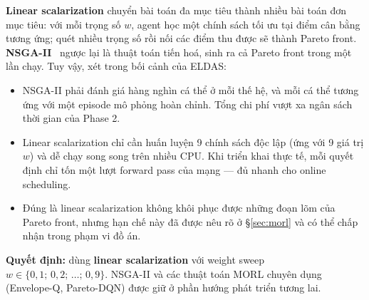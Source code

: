 \textbf{Linear scalarization} chuyển bài toán đa mục tiêu thành nhiều
bài toán đơn mục tiêu: với mỗi trọng số $w$, agent học một chính sách
tối ưu tại điểm cân bằng tương ứng; quét nhiều trọng số rồi nối các
điểm thu được sẽ thành Pareto front. \textbf{NSGA-II}~\cite{deb2002fast}
ngược lại là thuật toán tiến hoá, sinh ra cả Pareto front trong một
lần chạy. Tuy vậy, xét trong bối cảnh của ELDAS:
\begin{itemize}
  \item NSGA-II phải đánh giá hàng nghìn cá thể ở mỗi thế hệ, và
        mỗi cá thể tương ứng với một episode mô phỏng hoàn chỉnh.
        Tổng chi phí vượt xa ngân sách thời gian của Phase 2.
  \item Linear scalarization chỉ cần huấn luyện 9 chính sách độc
        lập (ứng với 9 giá trị $w$) và dễ chạy song song trên
        nhiều CPU. Khi triển khai thực tế, mỗi quyết định chỉ tốn
        một lượt forward pass của mạng --- đủ nhanh cho online
        scheduling.
  \item Đúng là linear scalarization không khôi phục được những
        đoạn lõm của Pareto front, nhưng hạn chế này đã được nêu
        rõ ở §\ref{sec:morl} và có thể chấp nhận trong phạm vi đồ
        án.
\end{itemize}

\textbf{Quyết định:} dùng \textbf{linear scalarization} với weight
sweep $w \in \{0{,}1;\, 0{,}2;\, \dots;\, 0{,}9\}$. NSGA-II và các
thuật toán MORL chuyên dụng (Envelope-Q, Pareto-DQN) được giữ ở phần
hướng phát triển tương lai.

